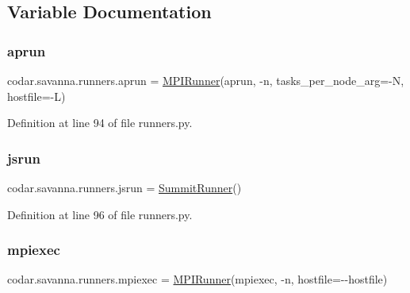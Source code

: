 \subsection{Variable Documentation}
\mbox{\label{namespacecodar_1_1savanna_1_1runners_a7b4e5f219f78f5e43c89915f24c32d21}} 
\subsubsection{\texorpdfstring{aprun}{aprun}}
{\footnotesize\ttfamily codar.\+savanna.\+runners.\+aprun = \hyperlink{classcodar_1_1savanna_1_1runners_1_1_m_p_i_runner}{M\+P\+I\+Runner}(\textquotesingle{}aprun\textquotesingle{}, \textquotesingle{}-\/n\textquotesingle{}, tasks\+\_\+per\+\_\+node\+\_\+arg=\textquotesingle{}-\/N\textquotesingle{}, hostfile=\textquotesingle{}-\/L\textquotesingle{})}



Definition at line 94 of file runners.\+py.

\mbox{\label{namespacecodar_1_1savanna_1_1runners_afe9b7578576f631ee95c5f01d4ac371f}} 
\subsubsection{\texorpdfstring{jsrun}{jsrun}}
{\footnotesize\ttfamily codar.\+savanna.\+runners.\+jsrun = \hyperlink{classcodar_1_1savanna_1_1runners_1_1_summit_runner}{Summit\+Runner}()}



Definition at line 96 of file runners.\+py.

\mbox{\label{namespacecodar_1_1savanna_1_1runners_a253b35f7f2855a4ba3bb161c9e3ff1cd}} 
\subsubsection{\texorpdfstring{mpiexec}{mpiexec}}
{\footnotesize\ttfamily codar.\+savanna.\+runners.\+mpiexec = \hyperlink{classcodar_1_1savanna_1_1runners_1_1_m_p_i_runner}{M\+P\+I\+Runner}(\textquotesingle{}mpiexec\textquotesingle{}, \textquotesingle{}-\/n\textquotesingle{}, hostfile=\textquotesingle{}-\/-\/hostfile\textquotesingle{})}



